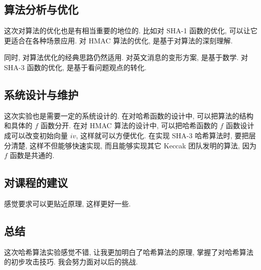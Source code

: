 \documentclass[12pt,a4paper]{article}
\begin{document}
\subsection*{算法分析与优化}

这次对算法的优化也是有相当重要的地位的. 比如对 SHA-1 函数的优化, 可以让它更适合在各种场景应用. 对 HMAC 算法的优化, 是基于对算法的深刻理解. 

同时, 对算法优化的经典思路仍然适用. 对英文消息的变形方案, 是基于数学. 对 SHA-3 函数的优化, 是基于看问题观点的转化. 

\subsection*{系统设计与维护}

这次实验也是需要一定的系统设计的. 在对哈希函数的设计中, 可以把算法的结构和具体的 $ f $ 函数分开. 在对 HMAC 算法的设计中, 可以把哈希函数的 $ f $ 函数设计成可以改变初始向量 $ iv $, 这样就可以方便优化. 在实现 SHA-3 哈希算法时, 要把层分清楚, 这样不但能够快速实现, 而且能够实现其它 Keccak 团队发明的算法, 因为 $ f $ 函数是共通的. 

\subsection*{对课程的建议}

感觉要求可以更贴近原理, 这样更好一些. 

\subsection*{总结}

这次哈希算法实验感觉不错, 让我更加明白了哈希算法的原理, 掌握了对哈希算法的初步攻击技巧. 我会努力面对以后的挑战. 
\end{document}
